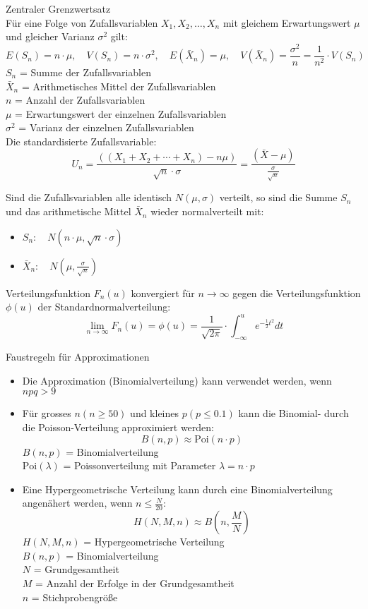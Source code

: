 \begin{theorem}{Zentraler Grenzwertsatz}\\
Für eine Folge von Zufallsvariablen $X_1, X_2, \ldots, X_n$ mit gleichem Erwartungswert $\mu$ und gleicher Varianz $\sigma^2$ gilt:
$$
E(S_n)=n \cdot \mu, \quad V(S_n)=n \cdot \sigma^2, \quad E(\bar{X}_n)=\mu, \quad V(\bar{X}_n)=\frac{\sigma^2}{n}=\frac{1}{n^2} \cdot V(S_n)
$$
$S_n$ = Summe der Zufallsvariablen\\
$\bar{X}_n$ = Arithmetisches Mittel der Zufallsvariablen\\
$n$ = Anzahl der Zufallsvariablen\\
$\mu$ = Erwartungswert der einzelnen Zufallsvariablen\\
$\sigma^2$ = Varianz der einzelnen Zufallsvariablen\\

Die standardisierte Zufallsvariable:
$$
U_n=\frac{((X_1+X_2+\cdots+X_n)-n\mu)}{\sqrt{n} \cdot \sigma}=\frac{(\bar{X}-\mu)}{\frac{\sigma}{\sqrt{n}}}
$$

Sind die Zufallsvariablen alle identisch $N(\mu,\sigma)$ verteilt, so sind die Summe $S_n$ und das arithmetische Mittel $\bar{X}_n$ wieder normalverteilt mit:
\begin{itemize}
  \item $S_n: \quad N(n \cdot \mu, \sqrt{n} \cdot \sigma)$
  \item $\bar{X}_n: \quad N(\mu, \frac{\sigma}{\sqrt{n}})$
\end{itemize}

Verteilungsfunktion $F_n(u)$ konvergiert für $n \to \infty$ gegen die Verteilungsfunktion $\phi(u)$ der Standardnormalverteilung:
$$
\lim_{n\to\infty} F_n(u) = \phi(u) = \frac{1}{\sqrt{2\pi}} \cdot \int_{-\infty}^u e^{-\frac{1}{2}t^2} dt
$$
\end{theorem}

\begin{concept}{Faustregeln für Approximationen}
\begin{itemize}
  \item Die Approximation (Binomialverteilung) kann verwendet werden, wenn $npq > 9$
  \item Für grosses $n(n \geq 50)$ und kleines $p(p \leq 0.1)$ kann die Binomial- durch die Poisson-Verteilung approximiert werden:
  $$
  B(n,p) \approx \text{Poi}(n \cdot p)
  $$
  $B(n,p)$ = Binomialverteilung\\
  $\text{Poi}(\lambda)$ = Poissonverteilung mit Parameter $\lambda = n \cdot p$\\
  
  \item Eine Hypergeometrische Verteilung kann durch eine Binomialverteilung angenähert werden, wenn $n \leq \frac{N}{20}$:
  $$
  H(N,M,n) \approx B(n,\frac{M}{N})
  $$
  $H(N,M,n)$ = Hypergeometrische Verteilung\\
  $B(n,p)$ = Binomialverteilung\\
  $N$ = Grundgesamtheit\\
  $M$ = Anzahl der Erfolge in der Grundgesamtheit\\
  $n$ = Stichprobengröße\\
\end{itemize}
\end{concept}

